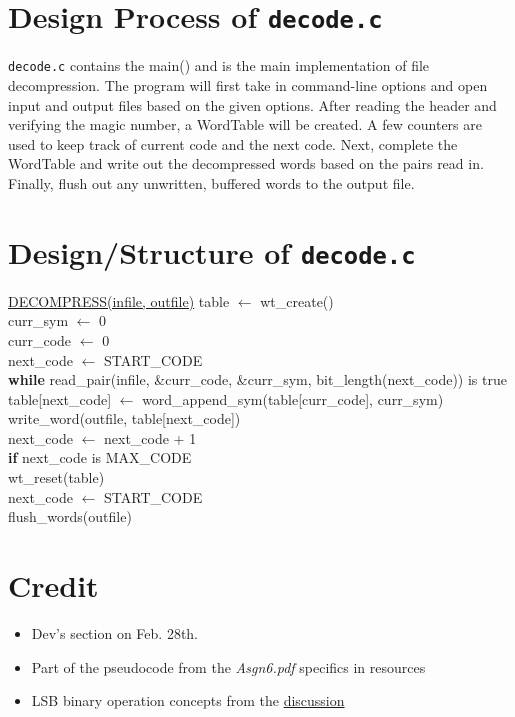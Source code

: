 \documentclass[12pt]{article}
\begin{document}
\section{Design Process of \texttt{decode.c}}

\texttt{decode.c} contains the main() and is the main implementation of file decompression. The program will first take in command-line options and open input and output files based on the given options. 
After reading the header and verifying the magic number, a WordTable will be created. A few counters are used to keep track of current code and the next code. Next, complete the WordTable and write out the decompressed words based on the pairs read in. Finally, flush out any unwritten, buffered words to the output file.
\\
\section{Design/Structure of \texttt{decode.c}}

\underline{DECOMPRESS(infile, outfile)}
\indent table $\leftarrow$ wt\_create() \\
\indent curr\_sym $\leftarrow$ 0 \\
\indent curr\_code $\leftarrow$ 0 \\
\indent next\_code $\leftarrow$ START\_CODE \\
\indent \textbf{while} read\_pair(infile, \&curr\_code, \&curr\_sym, bit\_length(next\_code)) is true \\
\indent \indent table[next\_code] $\leftarrow$ word\_append\_sym(table[curr\_code], curr\_sym) \\
\indent \indent write\_word(outfile, table[next\_code]) \\
\indent \indent next\_code $\leftarrow$ next\_code + 1 \\
\indent \indent \textbf{if} next\_code is MAX\_CODE \\
\indent \indent \indent wt\_reset(table) \\
\indent \indent \indent next\_code $\leftarrow$ START\_CODE \\
\indent flush\_words(outfile)
\\
\section{Credit}

\begin{itemize}
\item Dev's section on Feb. 28th.
\item Part of the pseudocode from the \textit{Asgn6.pdf} specifics in resources
\item LSB binary operation concepts from the \href{https://stackoverflow.com/questions/59294026/binary-representation-starting-with-a-least-significant-bit-in-c}{discussion}
\end{itemize}
\end{document}
